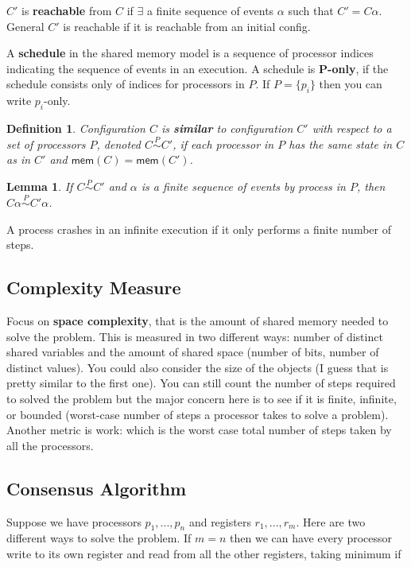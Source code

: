 \documentclass[twoside]{article}
\newtheorem{lemma}[theorem]{Lemma}
\newtheorem{definition}[theorem]{Definition}
\newcommand\memF{\mathsf{mem}}
\begin{document}
$C'$ is \textbf{reachable} from $C$ if $\exists$ a finite sequence of events $\alpha$ such that $C' = C\alpha$. General $C'$ is reachable if it is reachable from an initial config.

A \textbf{schedule} in the shared memory model is a sequence of processor indices indicating the sequence of events in an execution. A schedule is \textbf{P-only}, if the schedule consists only of indices for processors in $P$. If $P = \{p_i\}$ then you can write $p_i$-only.

\begin{definition}
Configuration $C$ is \textbf{similar} to configuration $C'$ with respect to a set of processors $P$, denoted $C \stackrel{P}{\sim} C'$, if each processor in $P$ has the same state in $C$ as in $C'$ and $\memF(C) = \memF(C')$. 
\end{definition}

\begin{lemma}
If $C \stackrel{P}{\sim} C'$ and $\alpha$ is a finite sequence of events by process in $P$, then $C\alpha \stackrel{P}{\sim} C'\alpha$.
\end{lemma}

A process crashes in an infinite execution if it only performs a finite number of steps.

\subsection{Complexity Measure}
Focus on \textbf{space complexity}, that is the amount of shared memory needed to solve the problem. This is measured in two different ways: number of distinct shared variables and the amount of shared space (number of bits, number of distinct values). You could also consider the size of the objects (I guess that is pretty similar to the first one). You can still count the number of steps required to solved the problem but the major concern here is to see if it is finite, infinite, or bounded (worst-case number of steps a processor takes to solve a problem). Another metric is work: which is the worst case total number of steps taken by all the processors.

\subsection{Consensus Algorithm}
Suppose we have processors $p_1, ..., p_n$ and registers $r_1, ..., r_m$. Here are two different ways to solve the problem. If $m = n$ then we can have every processor write to its own register and read from all the other registers, taking minimum if 
\end{document}

